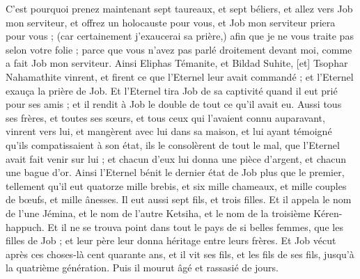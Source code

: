 \begin{multicols}{2}
C'est pourquoi prenez maintenant sept taureaux, et sept béliers, et allez vers Job mon serviteur, et offrez un holocauste pour vous, et Job mon serviteur priera pour vous ; (car certainement j'exaucerai sa prière,) afin que je ne vous traite pas selon votre folie ; parce que vous n'avez pas parlé droitement devant moi, comme a fait Job mon serviteur.
Ainsi Eliphas Témanite, et Bildad Suhite, [et] Tsophar Nahamathite vinrent, et firent ce que l'Eternel leur avait commandé ; et l'Eternel exauça la prière de Job.
Et l'Eternel tira Job de sa captivité quand il eut prié pour ses amis ; et il rendit à Job le double de tout ce qu'il avait eu.
Aussi tous ses frères, et toutes ses sœurs, et tous ceux qui l'avaient connu auparavant, vinrent vers lui, et mangèrent avec lui dans sa maison, et lui ayant témoigné qu'ils compatissaient à son état, ils le consolèrent de tout le mal, que l'Eternel avait fait venir sur lui ; et chacun d'eux lui donna une pièce d'argent, et chacun une bague d'or.
Ainsi l'Eternel bénit le dernier état de Job plus que le premier, tellement qu'il eut quatorze mille brebis, et six mille chameaux, et mille couples de bœufs, et mille ânesses.
Il eut aussi sept fils, et trois filles.
Et il appela le nom de l'une Jémina, et le nom de l'autre Ketsiha, et le nom de la troisième Kéren-happuch.
Et il ne se trouva point dans tout le pays de si belles femmes, que les filles de Job ; et leur père leur donna héritage entre leurs frères.
Et Job vécut après ces choses-là cent quarante ans, et il vit ses fils, et les fils de ses fils, jusqu'à la quatrième génération.
Puis il mourut âgé et rassasié de jours.
\PPE{}
\end{multicols}
